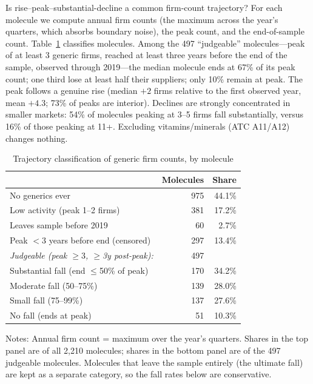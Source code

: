 \documentclass[11pt]{article}
\begin{document}
Is rise--peak--substantial-decline a common firm-count trajectory? For each
molecule we compute annual firm counts (the maximum across the year's
quarters, which absorbs boundary noise), the peak count, and the
end-of-sample count. Table~\ref{tab:classes} classifies molecules. Among the
497 ``judgeable'' molecules---peak of at least 3 generic firms, reached at
least three years before the end of the sample, observed through 2019---the
median molecule ends at 67\% of its peak count; one third lose at least
half their suppliers; only 10\% remain at peak. The peak follows a genuine
rise (median $+2$ firms relative to the first observed year, mean $+4.3$;
73\% of peaks are interior). Declines are strongly concentrated in smaller
markets: 54\% of molecules peaking at 3--5 firms fall substantially, versus
16\% of those peaking at 11+. Excluding vitamins/minerals (ATC A11/A12)
changes nothing.

\begin{table}[htbp]
\centering
\caption{Trajectory classification of generic firm counts, by molecule}
\label{tab:classes}
\begin{tabular}{lrr}
\toprule
 & Molecules & Share \\
\midrule
No generics ever                    &   975 & 44.1\% \\
Low activity (peak 1--2 firms)      &   381 & 17.2\% \\
Leaves sample before 2019           &    60 &  2.7\% \\
Peak $<$3 years before end (censored) & 297 & 13.4\% \\
\addlinespace
\emph{Judgeable (peak $\geq 3$, $\geq$3y post-peak):} & 497 & \\
\quad Substantial fall (end $\leq$50\% of peak) & 170 & 34.2\% \\
\quad Moderate fall (50--75\%)                  & 139 & 28.0\% \\
\quad Small fall (75--99\%)                     & 137 & 27.6\% \\
\quad No fall (ends at peak)                    &  51 & 10.3\% \\
\bottomrule
\end{tabular}
\par\smallskip
\parbox{0.92\textwidth}{\footnotesize Notes: Annual firm count = maximum
over the year's quarters. Shares in the top panel are of all 2{,}210
molecules; shares in the bottom panel are of the 497 judgeable molecules.
Molecules that leave the sample entirely (the ultimate fall) are kept as a
separate category, so the fall rates below are conservative.}
\end{table}
\end{document}
